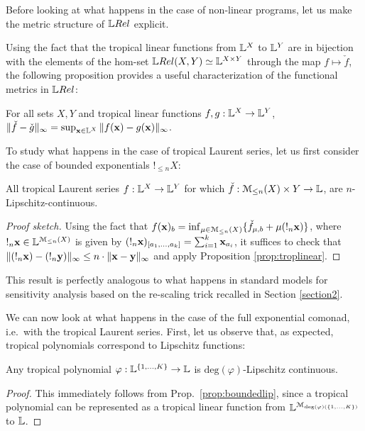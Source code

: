Before looking at what happens in the case of non-linear programs, let us make the metric structure of $\LREL$ explicit. 

Using the fact that the tropical linear functions from $\mathbb{L}^{X}$ to $\mathbb{L}^{Y}$ are in bijection with the elements of the hom-set $\LREL(X,Y)\simeq \Lawv^{X\times Y}$ through the map $f\mapsto \check f$, the following proposition provides a useful characterization of the functional metrics in $\LREL$:
\begin{proposition}
For all sets $X,Y$ and tropical linear functions $f,g:\mathbb{L}^{X}\to \mathbb{L}^{Y}$, $\| \check f-\check g\|_{\infty} =  \sup_{\mathbf{x}\in \mathbb{L}^{X}}
\| f(\mathbf{x})-g(\mathbf{x})\|_{\infty}$.\end{proposition}

To study what happens in the case of tropical Laurent series, let us first consider the case of bounded exponentials $!_{\leq n}X$:
\begin{proposition}\label{prop:boundedlip}
All tropical Laurent series $f: \mathbb{L}^{X}\to \mathbb{L}^{Y}$ for which $\check f:{\mathcal{M}_{\leq n}(X)}\times Y\to \mathbb{L}$, are $n$-Lipschitz-continuous.
\end{proposition}
\begin{proof}[Proof sketch]
Using the fact that $f(\mathbf{x})_{b}=\inf_{\mu\in \mathcal{M}_{\leq n}(X)}\{ \check f_{\mu,b}+ \mu (!_{n}\mathbf{x}) \}$, where $!_{n}\mathbf{x}\in \mathbb{L}^{\mathcal{M}_{\leq n}(X)}$ is given by 
$(!_{n}\mathbf{x})_{[a_{1},\dots, a_{k}]}=\sum_{i=1}^{k}\mathbf{x}_{a_{i}}$, 
it suffices to check that $\| (!_{n}\mathbf{x})-(!_{n}\mathbf{y})\|_{\infty}\leq n\cdot \| \mathbf{x}-\mathbf{y}\|_{\infty}$ and apply Proposition \ref{prop:troplinear}.
\end{proof}
This result is perfectly analogous to what happens in standard models for sensitivity analysis based on the re-scaling trick recalled in Section \ref{section2}.

We can now look at what happens in the case of the full exponential comonad, i.e.~with the tropical Laurent series.
First, let us observe that, as expected, tropical polynomials 
correspond to Lipschitz functions:
\begin{proposition}
Any tropical polynomial $\varphi:\mathbb{L}^{\{1,\dots, K\}}\to\mathbb{L}$ is $\mathrm{deg}(\varphi)$-Lipschitz continuous.
\end{proposition}
\begin{proof}
This immediately follows from Prop.~\ref{prop:boundedlip}, since a tropical polynomial can be represented as a tropical linear function from $\mathbb{L}^{\mathcal{M}_{\mathrm{deg}(\varphi)(\{1,\dots, K\})}}$ to $\mathbb{L}$.
\end{proof}


